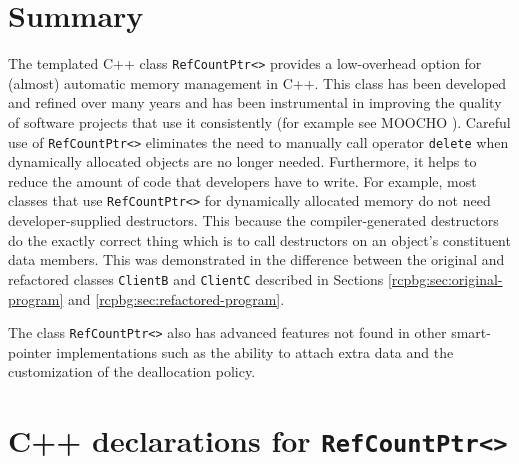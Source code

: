\documentclass[pdf,ps2pdf,11pt]{SANDreport}
\begin{document}
%
\section{Summary}
%

The templated C++ class {}\texttt{Ref\-Count\-Ptr<>} provides a
low-overhead option for (almost) automatic memory management in C++.
This class has been developed and refined over many years and has been
instrumental in improving the quality of software projects that use it
consistently (for example see MOOCHO {}\cite{ref:moochouserguide}).
Careful use of {}\texttt{Ref\-Count\-Ptr<>} eliminates the need to
manually call operator {}\texttt{delete} when dynamically allocated
objects are no longer needed.  Furthermore, it helps to reduce the
amount of code that developers have to write.  For example, most
classes that use {}\texttt{Ref\-Count\-Ptr<>} for dynamically
allocated memory do not need developer-supplied destructors.  This
because the compiler-generated destructors do the exactly correct
thing which is to call destructors on an object's constituent data
members.  This was demonstrated in the difference between the original
and refactored classes {}\texttt{ClientB} and {}\texttt{ClientC}
described in Sections {}\ref{rcpbg:sec:original-program} and
{}\ref{rcpbg:sec:refactored-program}.

The class {}\texttt{Ref\-Count\-Ptr<>} also has advanced features not
found in other smart-pointer implementations such as the ability to
attach extra data and the customization of the deallocation policy.

%
\clearpage



%

\appendix

%
\section{C++ declarations for {}\texttt{Ref\-Count\-Ptr<>}}
\label{rcpqs:apdx:c++decl}
%
\end{document}
